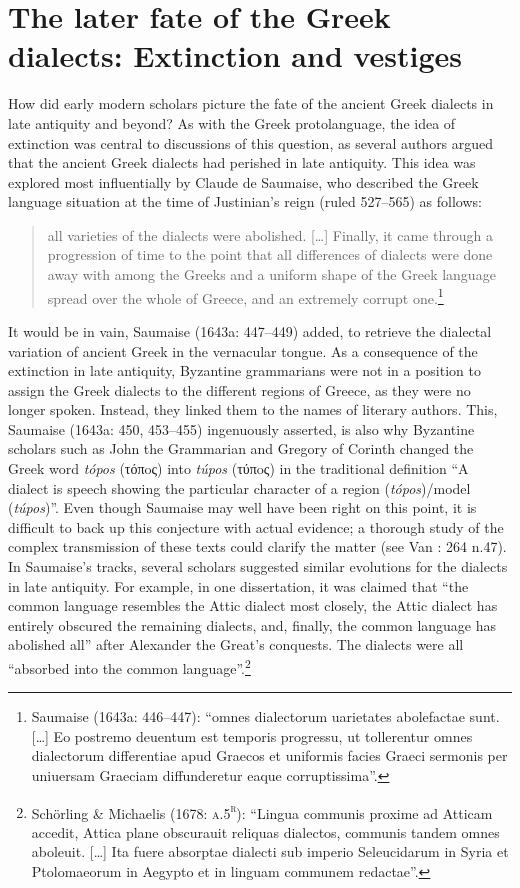 \section{The later fate of the Greek dialects: Extinction and vestiges}

How did early modern scholars picture the fate of the ancient Greek dialects in late antiquity and beyond? As with the Greek protolanguage, the idea of extinction was central to discussions of this question, as several authors argued that the ancient Greek dialects had perished in late antiquity. This idea was explored most influentially by Claude de Saumaise, who described the Greek language situation at the time of Justinian’s reign (ruled 527–565) as follows:

\begin{quote}
all varieties of the dialects were abolished. […] Finally, it came through a progression of time to the point that all differences of dialects were done away with among the Greeks and a uniform shape of the Greek language spread over the whole of Greece, and an extremely corrupt one.\footnote{Saumaise (1643a: 446–447): “omnes dialectorum uarietates abolefactae sunt. […] Eo postremo deuentum est temporis progressu, ut tollerentur omnes dialectorum differentiae apud Graecos et uniformis facies Graeci sermonis per uniuersam Graeciam diffunderetur eaque corruptissima”.}
\end{quote}

It would be in vain, Saumaise (1643a: 447–449) added, to retrieve the dialectal variation of ancient Greek in the vernacular tongue. As a consequence of the extinction in late antiquity, Byzantine grammarians were not in a position to assign the Greek dialects to the different regions of Greece, as they were no longer spoken. Instead, they linked them to the names of literary authors. This, Saumaise (1643a: 450, 453–455) ingenuously asserted, is also why Byzantine scholars such as John the Grammarian and Gregory of Corinth changed the Greek word \textit{tópos} (τόπoς) into \textit{túpos} (τύπoς) in the traditional definition “A dialect is speech showing the particular character of a region (\textit{tópos})/model (\textit{túpos})”. Even though Saumaise may well have been right on this point, it is difficult to back up this conjecture with actual evidence; a thorough study of the complex transmission of these texts could clarify the matter (see Van \citealt{Rooy2016d}: 264 n.47). In Saumaise’s tracks, several scholars suggested similar evolutions for the dialects in late antiquity. For example, in one dissertation, it was claimed that “the common language resembles the Attic dialect most closely, the Attic dialect has entirely obscured the remaining dialects, and, finally, the common language has abolished all” after Alexander the Great’s conquests. The dialects were all “absorbed into the common language”.\footnote{Schörling \& Michaelis (1678: \textsc{a.5}\textsc{\textsuperscript{r}}): “Lingua communis proxime ad Atticam accedit, Attica plane obscurauit reliquas dialectos, communis tandem omnes aboleuit. […] Ita fuere absorptae dialecti sub imperio Seleucidarum in Syria et Ptolomaeorum in Aegypto et in linguam communem redactae”.}

